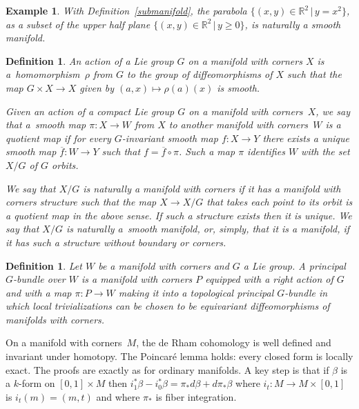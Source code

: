 \documentclass[pdftex]{sigma}
\numberwithin{equation}{section}
\newtheorem{Definition}[Lemma]{Definition}
\newtheorem{Example}[Lemma]{Example}
\begin{document}
\begin{Example}
  With Def\/inition~\ref{submanifold}, the parabola $\{(x,y)\in {\mathbb R}^2
  \,|\, y = x^2 \}$, as a subset of the upper half plane $\{(x,y)\in
  {\mathbb R}^2 \,|\, y \geq 0 \}$, is naturally a smooth manifold.
\end{Example}

\begin{Definition} \label{quotient}
  An \emph{action} of a Lie group $G$ on a manifold with corners $X$
  is a~homomor\-phism~$\rho$ from $G$ to the group of dif\/feomorphisms of
  $X$ such that the map $G \times X \to X$ given by $(a,x) \mapsto
  \rho(a)(x)$ is smooth.

  Given an action of a compact Lie group $G$ on a manifold with corners~$X$,
  we say that a~smooth
  map $\pi \colon X \to W$ from $X$ to another manifold with corners~$W$ is \emph{a quotient map} if for every $G$-invariant smooth map
  $f \colon X \to Y$ there exists a unique smooth map $\overline{f} \colon W
  \to Y$ such that $f = \overline{f} \circ \pi$.
  Such a map $\pi$ identif\/ies $W$ with the set $X/G$ of $G$ orbits.

  We say that $X/G$ is \emph{naturally a manifold with corners}
  if it has a manifold with corners structure such that the map $X \to X/G$
  that takes each point to its orbit is a quotient map in the above sense.
  If such a structure exists then it is unique.  We say that $X/G$
  is \emph{naturally a~smooth manifold}, or, simply, that it is a manifold,
  if it has such a structure without boundary or corners.
\end{Definition}

\begin{Definition}\label{def:pric_G-bundle_corners}
  Let $W$ be a manifold with corners and $G$ a Lie group.
  A \emph{principal $G$-bundle} over $W$ is a manifold with corners $P$
  equipped with a right action of $G$ and with a map $\pi\colon P\to W$
  making it into a topological principal $G$-bundle
  in which local trivializations can be chosen to be equivariant
  dif\/feomorphisms of manifolds with corners.
\end{Definition}

On a manifold with corners~$M$, the de Rham cohomology
is well def\/ined and invariant under homotopy.
The Poincar\'e lemma holds: every closed form is locally exact.
The proofs are exactly as for ordinary manifolds.
A key step is that if $\beta$ is a $k$-form on $[0,1] \times M$
then $i_1^* \beta - i_0^* \beta = \pi_* d\beta + d \pi_* \beta$
where $i_t \colon M \to M \times [0,1]$ is $i_t(m) = (m,t)$
and where $\pi_*$ is f\/iber integration.
\end{document}
